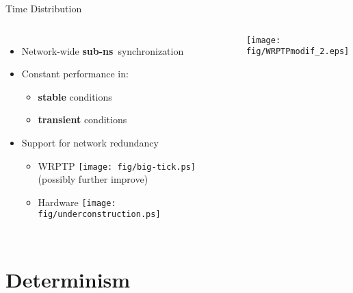 \documentclass[compress,red]{beamer}
\begin{document}
\begin{frame}{Time Distribution}

  \begin{columns}[c]

  \begin{itemize}
    \item Network-wide {\bf sub-ns}~synchronization
    \vspace{0.3cm}
    \item Constant performance in:
	\begin{itemize}
	  \item {\bf stable} conditions
	  \item {\bf transient} conditions
	\end{itemize}
    \vspace{0.3cm}
    \item Support for network redundancy
    \begin{itemize}
      \item WRPTP \texttt{[image: fig/big-tick.ps]}  (possibly further improve)
      \item Hardware \texttt{[image: fig/underconstruction.ps]}
    \end{itemize}
  \end{itemize}


      \begin{center}
	\texttt{[image: fig/WRPTPmodif\_2.eps]}
      \end{center}  
    

  \end{columns}

\end{frame}
\section{Determinism}
\end{document}
